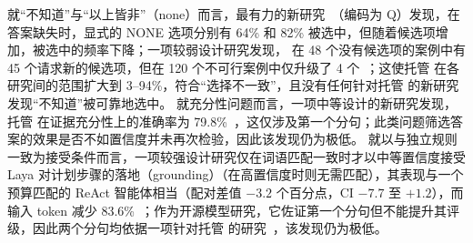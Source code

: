 就“不知道”与“以上皆非”（none）而言，最有力的新研究~\cite{arx03387}（编码为 Q）发现，在答案缺失时，显式的 NONE 选项分别有 64\% 和 82\% 被选中，但随着候选项增加，被选中的频率下降；一项较弱设计研究发现，\jev{} 在 48 个没有候选项的案例中有 45 个请求新的候选项，但在 120 个不可行案例中仅升级了 4 个~\cite{arx06425}；这使托管 \jev{} 在各研究间的范围扩大到 3--94\%，符合“选择不一致”，且没有任何针对托管 \jev{} 的新研究发现“不知道”被可靠地选中。
就充分性问题而言，一项中等设计的新研究发现，托管 \jev{} 在证据充分性上的准确率为 79.8\%~\cite{arx05107}，这仅涉及第一个分句；此类问题筛选答案的效果是否不如置信度并未再次检验，因此该发现仍为极低。
就以与独立规则一致为接受条件而言，一项较强设计研究仅在词语匹配一致时才以中等置信度接受 Laya 对计划步骤的落地（grounding）（在高置信度时则无需匹配），其表现与一个预算匹配的 ReAct 智能体相当（配对差值 $-3.2$ 个百分点，CI $-7.7$ 至 $+1.2$），而输入 token 减少 83.6\%~\cite{zen22904595}\zmark{}；作为开源模型研究，它佐证第一个分句但不能提升其评级，因此两个分句均依据一项针对托管 \jev{} 的研究~\cite{arx02048}，该发现仍为极低。

